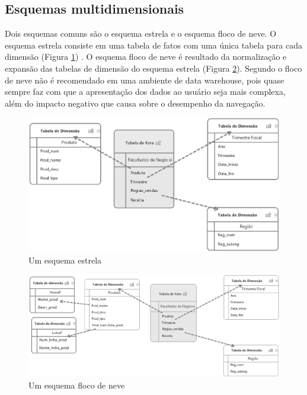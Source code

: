 \subsection{Esquemas multidimensionais}

Dois esquemas comuns são o esquema estrela e o esquema floco de neve. O esquema estrela consiste em uma tabela de fatos com uma única tabela para cada dimensão (Figura \ref{fig:star-schema}) \cite{elmasri_sistemas_2011}. O esquema floco de neve é resultado da normalização e expansão das tabelas de dimensão do esquema estrela \cite{ballard_dimensional_2006} (Figura \ref{fig:snowflake}). Segundo  o floco de neve não é recomendado em uma ambiente de data warehouse, pois quase sempre faz com que a apresentação dos dados ao usuário seja mais complexa, além do impacto negativo que causa sobre o desempenho da navegação.

\begin{figure}[h!]
\centering
\includegraphics[keepaspectratio=false,scale=0.65]{figuras/figuras_pedro/star-schema.eps}
\caption{Um esquema estrela}
\label{fig:star-schema}
\end{figure}
\FloatBarrier

\begin{figure}[h!]
\centering
\includegraphics[keepaspectratio=false,scale=0.50]{figuras/figuras_pedro/snowflake.eps}
\caption{Um esquema floco de neve}
\label{fig:snowflake}
\end{figure}
\FloatBarrier

